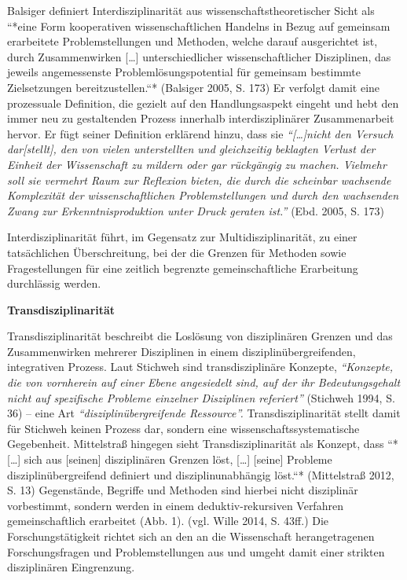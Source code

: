 \documentclass[a4paper,
fontsize=11pt,
oneside,
numbers=noperiodatend,
parskip=half-,
bibliography=totoc,
final
]{scrartcl}
\begin{document}
Balsiger definiert Interdisziplinarität aus wissenschaftstheoretischer
Sicht als ``*eine Form kooperativen wissenschaftlichen Handelns in Bezug
auf gemeinsam erarbeitete Problemstellungen und Methoden, welche darauf
ausgerichtet ist, durch Zusammenwirken {[}\ldots{}{]} unterschiedlicher
wissenschaftlicher Disziplinen, das jeweils angemessenste
Problemlösungspotential für gemeinsam bestimmte Zielsetzungen
bereitzustellen.``* (Balsiger 2005, S. 173) Er verfolgt damit eine
prozessuale Definition, die gezielt auf den Handlungsaspekt eingeht und
hebt den immer neu zu gestaltenden Prozess innerhalb interdisziplinärer
Zusammenarbeit hervor. Er fügt seiner Definition erklärend hinzu, dass
sie \emph{\enquote{{[}\ldots{}{]}nicht den Versuch dar{[}stellt{]}, den
von vielen unterstellten und gleichzeitig beklagten Verlust der Einheit
der Wissenschaft zu mildern oder gar rückgängig zu machen. Vielmehr soll
sie vermehrt Raum zur Reflexion bieten, die durch die scheinbar
wachsende Komplexität der wissenschaftlichen Problemstellungen und durch
den wachsenden Zwang zur Erkenntnisproduktion unter Druck geraten ist.}}
(Ebd. 2005, S. 173)

Interdisziplinarität führt, im Gegensatz zur Multidisziplinarität, zu
einer tatsächlichen Überschreitung, bei der die Grenzen für Methoden
sowie Fragestellungen für eine zeitlich begrenzte gemeinschaftliche
Erarbeitung durchlässig werden.

\textbf{Transdisziplinarität}

Transdisziplinarität beschreibt die Loslösung von disziplinären Grenzen
und das Zusammenwirken mehrerer Disziplinen in einem
disziplinübergreifenden, integrativen Prozess. Laut Stichweh sind
transdisziplinäre Konzepte, \emph{\enquote{Konzepte, die von vornherein
auf einer Ebene angesiedelt sind, auf der ihr Bedeutungsgehalt nicht auf
spezifische Probleme einzelner Disziplinen referiert}} (Stichweh 1994,
S. 36) -- eine Art \emph{\enquote{disziplinübergreifende Ressource}.}
Transdisziplinarität stellt damit für Stichweh keinen Prozess dar,
sondern eine wissenschaftssystematische Gegebenheit. Mittelstraß
hingegen sieht Transdisziplinarität als Konzept, dass ``*{[}\ldots{}{]}
sich aus {[}seinen{]} disziplinären Grenzen löst, {[}\ldots{}{]}
{[}seine{]} Probleme disziplinübergreifend definiert und
disziplinunabhängig löst.``* (Mittelstraß 2012, S. 13) Gegenstände,
Begriffe und Methoden sind hierbei nicht disziplinär vorbestimmt,
sondern werden in einem deduktiv-rekursiven Verfahren gemeinschaftlich
erarbeitet (Abb. 1). (vgl. Wille 2014, S. 43ff.) Die Forschungstätigkeit
richtet sich an den an die Wissenschaft herangetragenen Forschungsfragen
und Problemstellungen aus und umgeht damit einer strikten disziplinären
Eingrenzung.
\end{document}
